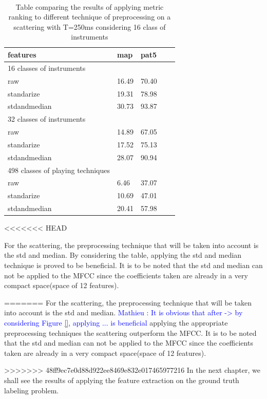 \documentclass[hidelinks,12pt]{report}
\newcommand{\ml}[1]{\textcolor{blue}{ Mathieu : #1}}
\begin{document}
\begin{table} [H]
\begin{center} 
\ 
 \setlength{\tabcolsep}{.16667em} 
\begin{tabular}{ | l | l | l | l | l |}
features & map & pat5  \\ 
\hline 
16 classes of instruments\\
\hline

raw & 16.49 & 70.40  \\ 
standarize & 19.31 & 78.98 \\ 
stdandmedian & 30.73 & 93.87 \\ \hline
 32 classes of instruments \\ 
 \hline
 

 raw & 14.89 & 67.05 \\ 
standarize & 17.52 & 75.13  \\ 
stdandmedian & 28.07 & 90.94  \\ 
\hline
 498 classes of playing techniques \\
 \hline

raw &  6.46 & 37.07  \\ 
standarize & 10.69 & 47.01  \\ 
stdandmedian & 20.41 & 57.98  \\ 
\end{tabular} 
\end{center} 
\caption{Table comparing the results of applying metric ranking to different technique of preprocessing on a scattering with T=250ms considering 16 class of instruments} 
\label{you} 
\end{table}

<<<<<<< HEAD





For the scattering, the preprocessing technique that will be taken into account is the std and median. By considering the table, applying the std and median technique is proved to be beneficial. It is to be noted that the std and median can not be applied to the MFCC since the coefficients taken are already in a very compact space(space of 12 features). \par
=======
For the scattering, the preprocessing technique that will be taken into account is the std and median. \ml{It is obvious that after -> by considering Figure \ref{}, applying ... is beneficial} applying the appropriate preprocessing techniques the scattering outperform the MFCC. It is to be noted that the std and median can not be applied to the MFCC since the coefficients taken are already in a very compact space(space of 12 features). \par
>>>>>>> 48ff9ec7e0d88d922ee8469e832e017465977216
In the next chapter, we shall see the results of applying the feature extraction on the ground truth labeling problem.
\end{document}
